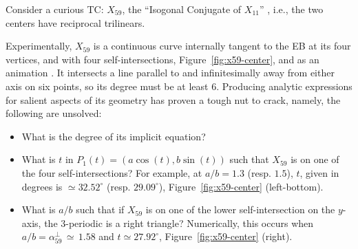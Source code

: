 %

Consider a curious TC: $X_{59}$, the ``Isogonal Conjugate of $X_{11}$'' \cite{etc}, i.e., the two centers have reciprocal trilinears.

Experimentally, $X_{59}$ is a continuous curve internally tangent to the EB at its four vertices, and with four self-intersections, Figure~\ref{fig:x59-center}, and as an animation \cite[PL\#12]{reznik2020-playlist-intriguing}. It intersects a line parallel to and infinitesimally away from either axis on six points, so its degree must be at least 6. Producing analytic expressions for salient aspects of its geometry has proven a tough nut to crack, namely, the following are unsolved:

\begin{itemize}
\item What is the degree of its implicit equation?
\item What is $t$ in $P_1(t)=\left(a\cos(t),b\sin(t)\right)$ such that $X_{59}$ is on one of the four self-intersections? For example, at $a/b=1.3$ (resp. $1.5$), $t$, given in degrees is ${\simeq}32.52^\circ$ (resp. $29.09^\circ$), Figure~\ref{fig:x59-center} (left-bottom).
\item What is $a/b$ such that if $X_{59}$ is on one of the lower self-intersection on the $y$-axis, the 3-periodic is a right triangle? Numerically, this occurs when $a/b=\alpha_{59}^\perp\,{\simeq}\,1.58$ and $t{\simeq}27.92^\circ$, Figure~\ref{fig:x59-center} (right).
\end{itemize}


